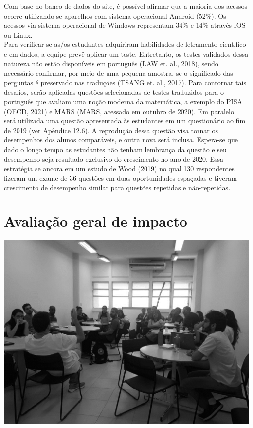 \documentclass[
]{book}
\begin{document}
Com base no banco de dados do site, é possível afirmar que a maioria dos acessos ocorre utilizando-se aparelhos com sistema operacional Android (52\%). Os acessos via sistema operacional de Windows representam 34\% e 14\% através IOS ou Linux.\\
Para verificar se as/os estudantes adquiriram habilidades de letramento científico e em dados, a equipe prevê aplicar um teste. Entretanto, os testes validados dessa natureza não estão disponíveis em português (LAW et. al., 2018), sendo necessário confirmar, por meio de uma pequena amostra, se o significado das perguntas é preservado nas traduções (TSANG et. al., 2017).
Para contornar tais desafios, serão aplicadas questões selecionadas de testes traduzidos para o português que avaliam uma noção moderna da matemática, a exemplo do PISA (OECD, 2021) e MARS (MARS, acessado em outubro de 2020). Em paralelo, será utilizada uma questão apresentada às estudantes em um questionário ao fim de 2019 (ver Apêndice 12.6). A reprodução dessa questão visa tornar os desempenhos dos alunos comparáveis, e outra nova será inclusa. Espera-se que dado o longo tempo as estudantes não tenham lembrança da questão e seu desempenho seja resultado exclusivo do crescimento no ano de 2020. Essa estratégia se ancora em um estudo de Wood (2019) no qual 130 respondentes fizeram um exame de 36 questões em duas oportunidades espaçadas e tiveram crescimento de desempenho similar para questões repetidas e não-repetidas.

\hypertarget{avaliauxe7uxe3o-geral-de-impacto}{%
\chapter{Avaliação geral de impacto}\label{avaliauxe7uxe3o-geral-de-impacto}}

\includegraphics{images/figura_capa/capa_impacto.png}
\end{document}
